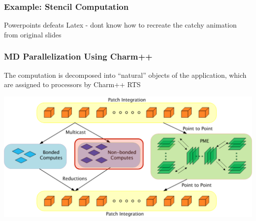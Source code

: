 \begin{frame}[t]
\frametitle{Example: Stencil Computation}
Powerpoints defeats Latex - dont know how to recreate the catchy animation from
original slides
\end{frame}

\begin{frame}[t]
\frametitle{MD Parallelization Using Charm++}
The computation is decomposed into ``natural” objects of the application, which
are assigned to processors by Charm++ RTS
  \begin{center} \includegraphics[width=\textwidth]{figures/md_parallelize.pdf} \end{center}
\end{frame}

